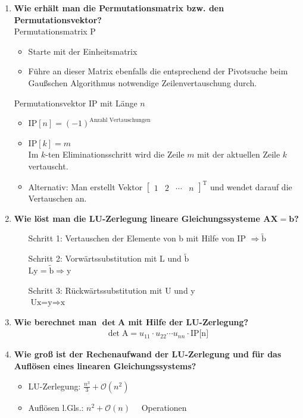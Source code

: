 \begin{enumerate}
		\item \textbf{Wie erhält man die Permutationsmatrix bzw. den Permutationsvektor?} \\
			Permutationsmatrix P
			\begin{itemize}
				\item Starte mit der Einheitsmatrix
				\item Führe an dieser Matrix ebenfalls die entsprechend der Pivotsuche beim Gaußschen Algorithmus notwendige Zeilenvertauschung durch.
			\end{itemize}
			Permutationsvektor IP mit Länge \(n\)
			\begin{itemize}
				\item \(\text{IP}[n]=(-1)^{\text{Anzahl Vertauschungen}}\)
				\item \(\text{IP}[k]=m\) \\
					Im \(k\)-ten Eliminationsschritt wird die Zeile \(m\) mit der aktuellen Zeile \(k\) vertauscht.
				\item Alternativ: Man erstellt Vektor \(\begin{bmatrix}
				1 & 2 & \cdots & n
				\end{bmatrix}^\text{T}\) und wendet darauf die Vertauschen an.
			\end{itemize}
		
		\item \textbf{Wie löst man die LU-Zerlegung lineare Gleichungssysteme \(\mathbf{AX=b}\)?}
			\begin{enumerate}
				\item[Schritt 1:] Vertauschen der Elemente von b mit Hilfe von IP \(\Rightarrow\tilde{\text{b}}\)
				\item[Schritt 2:] Vorwärtssubstitution mit L und \(\tilde{\text{b}}\) \\
				\(\text{Ly}=\tilde{\text{b}}\Rightarrow\text{y}\)
				\item[Schritt 3:] Rückwärtssubstitution mit U und y \\
				\(\text{Ux=y}\Rightarrow \text{x}\)
			\end{enumerate}
		
		\item \textbf{Wie berechnet man \(\mathbf{\det A}\) mit Hilfe der LU-Zerlegung?}
			\begin{align*}
				\det{\text{A}}=u_{11}\cdot u_{22}\cdots u_{nn}\cdot\text{IP[n]}
			\end{align*}
		
		\item \textbf{Wie groß ist der Rechenaufwand der LU-Zerlegung und für das Auflösen eines linearen Gleichungssystems?}
			\begin{itemize}
				\item LU-Zerlegung: \(\frac{n^3}{3}+\mathscr{O}(n^2) \quad\) 
				\item Auflösen l.Gls.: \(n^2+\mathscr{O}(n) \quad\) Operationen
			\end{itemize}
		

\end{enumerate}
